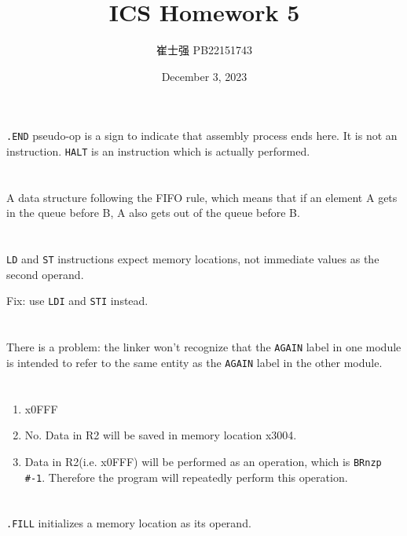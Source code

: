 \documentclass[UTF8]{ctexart}
\title{ICS Homework 5}
\author{崔士强 PB22151743}
\date{December 3, 2023}
\begin{document}
\maketitle

\section{}  %
\lstinline{.END} pseudo-op is a sign to indicate that assembly process 
ends here. It is not an instruction. \lstinline{HALT} is an instruction
which is actually performed.

\section{}  %
A data structure following the FIFO rule, which means that if an element A
gets in the queue before B, A also gets out of the queue before B.

\section{}  %
\lstinline{LD} and \lstinline{ST} instructions expect memory locations, 
not immediate values as the second operand.

Fix: use \lstinline{LDI} and \lstinline{STI} instead.

\section{}  %
There is a problem: the linker won't recognize that the \lstinline{AGAIN} label in one module is intended to refer to the same entity as the \lstinline{AGAIN} label in the other module.
\section{}  %
\begin{enumerate}
  \item x0FFF
  \item No. Data in R2 will be saved in memory location x3004.
  \item Data in R2(i.e. x0FFF) will be performed as an operation, which is \lstinline{BRnzp #-1}. 
  Therefore the program will repeatedly perform this operation.
\end{enumerate}

\section{}  %
\lstinline{.FILL} initializes a memory location as its operand. 
\end{document}
